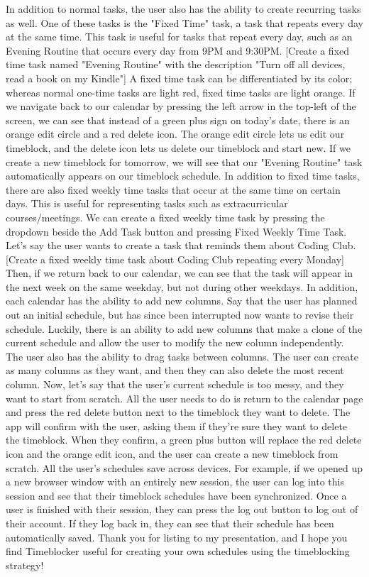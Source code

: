 \documentclass[notitlepage]{report}
\begin{document}
In addition to normal tasks, the user also has the ability to create recurring tasks as well. One of these tasks is the "Fixed Time" task, a task that repeats every day at the same time. This task is useful for tasks that repeat every day, such as an Evening Routine that occurs every day from 9PM and 9:30PM.
[Create a fixed time task named "Evening Routine" with the description "Turn off all devices, read a book on my Kindle"]
A fixed time task can be differentiated by its color; whereas normal one-time tasks are light red, fixed time tasks are light orange.
If we navigate back to our calendar by pressing the left arrow in the top-left of the screen, we can see that instead of a green plus sign on today's date, there is an orange edit circle and a red delete icon. The orange edit circle lets us edit our timeblock, and the delete icon lets us delete our timeblock and start new.
If we create a new timeblock for tomorrow, we will see that our "Evening Routine" task automatically appears on our timeblock schedule.
In addition to fixed time tasks, there are also fixed weekly time tasks that occur at the same time on certain days. This is useful for representing tasks such as extracurricular courses/meetings. We can create a fixed weekly time task by pressing the dropdown beside the Add Task button and pressing Fixed Weekly Time Task. Let's say the user wants to create a task that reminds them about Coding Club.
[Create a fixed weekly time task about Coding Club repeating every Monday]
Then, if we return back to our calendar, we can see that the task will appear in the next week on the same weekday, but not during other weekdays.
In addition, each calendar has the ability to add new columns. Say that the user has planned out an initial schedule, but has since been interrupted now wants to revise their schedule. Luckily, there is an ability to add new columns that make a clone of the current schedule and allow the user to modify the new column independently. The user also has the ability to drag tasks between columns.
The user can create as many columns as they want, and then they can also delete the most recent column.
Now, let's say that the user's current schedule is too messy, and they want to start from scratch. All the user needs to do is return to the calendar page and press the red delete button next to the timeblock they want to delete. The app will confirm with the user, asking them if they're sure they want to delete the timeblock. When they confirm, a green plus button will replace the red delete icon and the orange edit icon, and the user can create a new timeblock from scratch.
All the user's schedules save across devices. For example, if we opened up a new browser window with an entirely new session, the user can log into this session and see that their timeblock schedules have been synchronized.
Once a user is finished with their session, they can press the log out button to log out of their account. If they log back in, they can see that their schedule has been automatically saved.
Thank you for listing to my presentation, and I hope you find Timeblocker useful for creating your own schedules using the timeblocking strategy!
\end{document}
